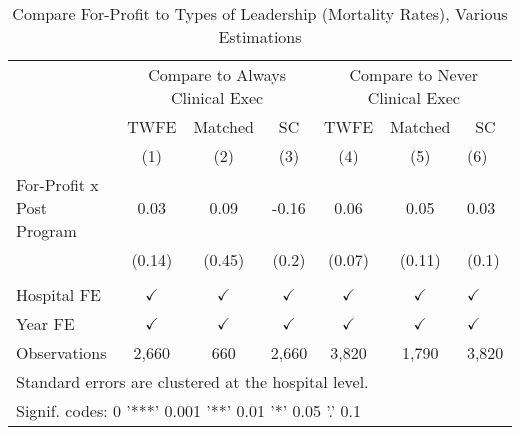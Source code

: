 \begin{table}[ht!]

\caption{\label{tab:forprofit_mort_estimators}Compare For-Profit to Types of Leadership (Mortality Rates), Various Estimations}
\centering
\begin{tabular}[t]{lcccccl}
\toprule
\multicolumn{1}{c}{ } & \multicolumn{3}{c}{Compare to Always Clinical Exec} & \multicolumn{3}{c}{Compare to Never Clinical Exec} \\
\cmidrule(l{3pt}r{3pt}){2-4} \cmidrule(l{3pt}r{3pt}){5-7}
\multicolumn{1}{c}{ } & \multicolumn{1}{c}{TWFE} & \multicolumn{1}{c}{Matched} & \multicolumn{1}{c}{SC} & \multicolumn{1}{c}{TWFE} & \multicolumn{1}{c}{Matched} & \multicolumn{1}{c}{SC} \\
\cmidrule(l{3pt}r{3pt}){2-2} \cmidrule(l{3pt}r{3pt}){3-3} \cmidrule(l{3pt}r{3pt}){4-4} \cmidrule(l{3pt}r{3pt}){5-5} \cmidrule(l{3pt}r{3pt}){6-6} \cmidrule(l{3pt}r{3pt}){7-7}
 & (1) & (2) & (3) & (4) & (5) & (6)\\
\midrule
For-Profit x Post Program & 0.03 & 0.09 & -0.16 & 0.06 & 0.05 & 0.03\\
 & (0.14) & (0.45) & (0.2) & (0.07) & (0.11) & (0.1)\\
 &  &  &  &  &  & \\
Hospital FE & $\checkmark$ & $\checkmark$ & $\checkmark$ & $\checkmark$ & $\checkmark$ & $\checkmark$\\
Year FE & $\checkmark$ & $\checkmark$ & $\checkmark$ & $\checkmark$ & $\checkmark$ & $\checkmark$\\
\addlinespace
Observations & 2,660 & 660 & 2,660 & 3,820 & 1,790 & 3,820\\
\bottomrule
\multicolumn{7}{l}{\textsuperscript{} Standard errors are clustered at the hospital level.}\\
\multicolumn{7}{l}{\textsuperscript{} Signif. codes: 0 '***' 0.001 '**' 0.01 '*' 0.05 '.' 0.1}\\
\end{tabular}
\end{table}
